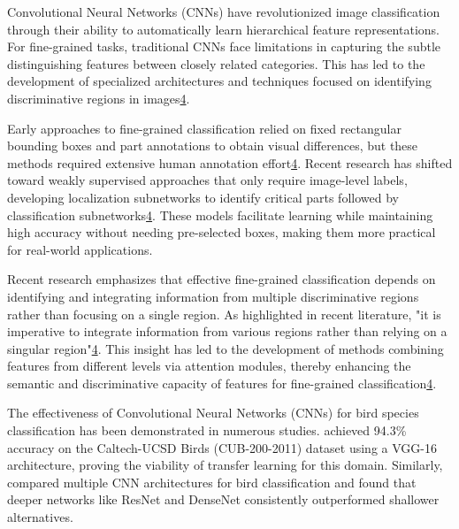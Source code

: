 \documentclass[a4paper,12pt]{report}
\begin{document}
Convolutional Neural Networks (CNNs) have revolutionized image classification through their ability to automatically learn hierarchical feature representations. For fine-grained tasks, traditional CNNs face limitations in capturing the subtle distinguishing features between closely related categories. This has led to the development of specialized architectures and techniques focused on identifying discriminative regions in images\href{https://www.frontiersin.org/journals/neurorobotics/articles/10.3389/fnbot.2024.1391791/full}{4}.

Early approaches to fine-grained classification relied on fixed rectangular bounding boxes and part annotations to obtain visual differences, but these methods required extensive human annotation effort\href{https://www.frontiersin.org/journals/neurorobotics/articles/10.3389/fnbot.2024.1391791/full}{4}. Recent research has shifted toward weakly supervised approaches that only require image-level labels, developing localization subnetworks to identify critical parts followed by classification subnetworks\href{https://www.frontiersin.org/journals/neurorobotics/articles/10.3389/fnbot.2024.1391791/full}{4}. These models facilitate learning while maintaining high accuracy without needing pre-selected boxes, making them more practical for real-world applications.

Recent research emphasizes that effective fine-grained classification depends on identifying and integrating information from multiple discriminative regions rather than focusing on a single region. As highlighted in recent literature, "it is imperative to integrate information from various regions rather than relying on a singular region"\href{https://www.frontiersin.org/journals/neurorobotics/articles/10.3389/fnbot.2024.1391791/full}{4}. This insight has led to the development of methods combining features from different levels via attention modules, thereby enhancing the semantic and discriminative capacity of features for fine-grained classification\href{https://www.frontiersin.org/journals/neurorobotics/articles/10.3389/fnbot.2024.1391791/full}{4}.



The effectiveness of Convolutional Neural Networks (CNNs) for bird species classification has been demonstrated in numerous studies. \citep{zhang2019bird} achieved 94.3\% accuracy on the Caltech-UCSD Birds (CUB-200-2011) dataset using a VGG-16 architecture, proving the viability of transfer learning for this domain. Similarly, \citep{marini2018bird} compared multiple CNN architectures for bird classification and found that deeper networks like ResNet and DenseNet consistently outperformed shallower alternatives.
\end{document}
